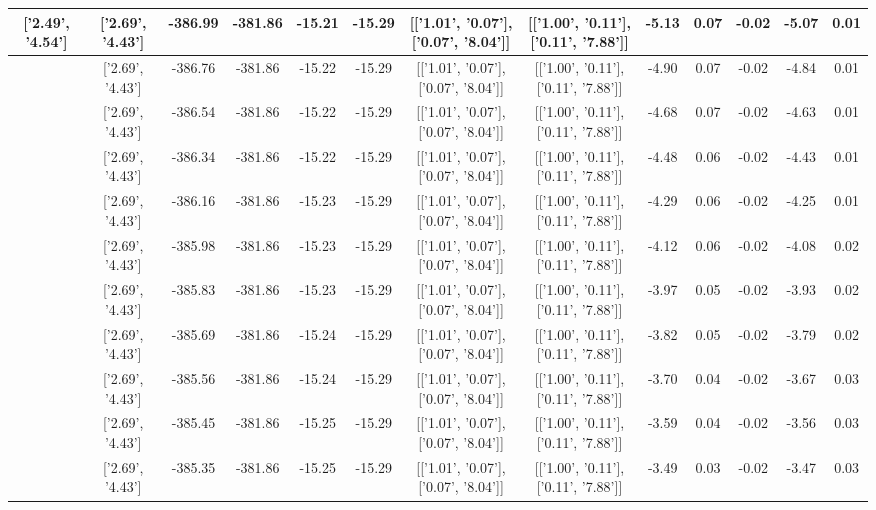 \begin{table}[htbp]
\begin{adjustbox}{angle=90}
\begin{tabular}{|c|c|c|c|c|c|c|c|c|c|c|c|c|}
 ['2.49', '4.54'] & ['2.69', '4.43'] & -386.99 & -381.86 & -15.21 & -15.29 & [['1.01', '0.07'], ['0.07', '8.04']] & [['1.00', '0.11'], ['0.11', '7.88']] & -5.13 & 0.07 & -0.02 & -5.07 & 0.01\\ \hline
 ['2.50', '4.53'] & ['2.69', '4.43'] & -386.76 & -381.86 & -15.22 & -15.29 & [['1.01', '0.07'], ['0.07', '8.04']] & [['1.00', '0.11'], ['0.11', '7.88']] & -4.90 & 0.07 & -0.02 & -4.84 & 0.01\\ \hline
 ['2.51', '4.52'] & ['2.69', '4.43'] & -386.54 & -381.86 & -15.22 & -15.29 & [['1.01', '0.07'], ['0.07', '8.04']] & [['1.00', '0.11'], ['0.11', '7.88']] & -4.68 & 0.07 & -0.02 & -4.63 & 0.01\\ \hline
 ['2.52', '4.52'] & ['2.69', '4.43'] & -386.34 & -381.86 & -15.22 & -15.29 & [['1.01', '0.07'], ['0.07', '8.04']] & [['1.00', '0.11'], ['0.11', '7.88']] & -4.48 & 0.06 & -0.02 & -4.43 & 0.01\\ \hline
 ['2.54', '4.51'] & ['2.69', '4.43'] & -386.16 & -381.86 & -15.23 & -15.29 & [['1.01', '0.07'], ['0.07', '8.04']] & [['1.00', '0.11'], ['0.11', '7.88']] & -4.29 & 0.06 & -0.02 & -4.25 & 0.01\\ \hline
 ['2.55', '4.50'] & ['2.69', '4.43'] & -385.98 & -381.86 & -15.23 & -15.29 & [['1.01', '0.07'], ['0.07', '8.04']] & [['1.00', '0.11'], ['0.11', '7.88']] & -4.12 & 0.06 & -0.02 & -4.08 & 0.02\\ \hline
 ['2.56', '4.50'] & ['2.69', '4.43'] & -385.83 & -381.86 & -15.23 & -15.29 & [['1.01', '0.07'], ['0.07', '8.04']] & [['1.00', '0.11'], ['0.11', '7.88']] & -3.97 & 0.05 & -0.02 & -3.93 & 0.02\\ \hline
 ['2.58', '4.49'] & ['2.69', '4.43'] & -385.69 & -381.86 & -15.24 & -15.29 & [['1.01', '0.07'], ['0.07', '8.04']] & [['1.00', '0.11'], ['0.11', '7.88']] & -3.82 & 0.05 & -0.02 & -3.79 & 0.02\\ \hline
 ['2.59', '4.48'] & ['2.69', '4.43'] & -385.56 & -381.86 & -15.24 & -15.29 & [['1.01', '0.07'], ['0.07', '8.04']] & [['1.00', '0.11'], ['0.11', '7.88']] & -3.70 & 0.04 & -0.02 & -3.67 & 0.03\\ \hline
 ['2.60', '4.48'] & ['2.69', '4.43'] & -385.45 & -381.86 & -15.25 & -15.29 & [['1.01', '0.07'], ['0.07', '8.04']] & [['1.00', '0.11'], ['0.11', '7.88']] & -3.59 & 0.04 & -0.02 & -3.56 & 0.03\\ \hline
 ['2.61', '4.47'] & ['2.69', '4.43'] & -385.35 & -381.86 & -15.25 & -15.29 & [['1.01', '0.07'], ['0.07', '8.04']] & [['1.00', '0.11'], ['0.11', '7.88']] & -3.49 & 0.03 & -0.02 & -3.47 & 0.03\\ \hline

\end{tabular}
\end{adjustbox}
\end{table}
